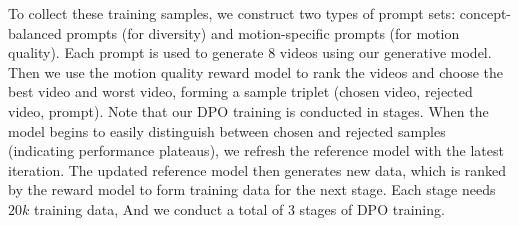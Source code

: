 \documentclass{article}
\begin{document}
{To collect these training samples, we construct two types of prompt sets: concept-balanced prompts (for diversity) and motion-specific prompts (for motion quality). Each prompt is used to generate 8 videos using our generative model. Then we use the motion quality reward model to rank the videos and choose the best video and worst video, forming a sample triplet (chosen video, rejected video, prompt). Note that our DPO training is conducted in stages. When the model begins to easily distinguish between chosen and rejected samples (indicating performance plateaus), we refresh the reference model with the latest iteration. The updated reference model then generates new data, which is ranked by the reward model to form training data for the next stage. Each stage needs $20k$ training data, And we conduct a total of 3 stages of DPO training.

}
\end{document}
